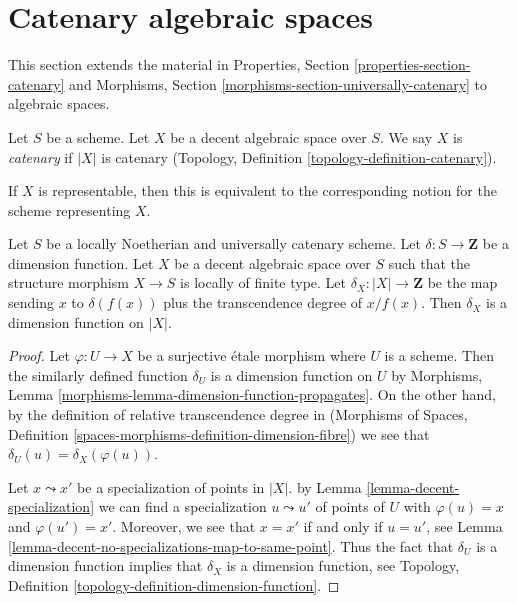 \section{Catenary algebraic spaces}
\label{section-catenary}

\noindent
This section extends the material in
Properties, Section \ref{properties-section-catenary}
and Morphisms, Section \ref{morphisms-section-universally-catenary}
to algebraic spaces.

\begin{definition}
\label{definition-catenary}
Let $S$ be a scheme. Let $X$ be a decent algebraic space over $S$.
We say $X$ is {\it catenary} if $|X|$ is catenary
(Topology, Definition \ref{topology-definition-catenary}).
\end{definition}

\noindent
If $X$ is representable, then this is equivalent to the corresponding notion
for the scheme representing $X$.

\begin{lemma}
\label{lemma-scheme-with-dimension-function}
Let $S$ be a locally Noetherian and universally catenary scheme.
Let $\delta : S \to \mathbf{Z}$ be a dimension function.
Let $X$ be a decent algebraic space over $S$ such that
the structure morphism $X \to S$ is locally of
finite type. Let $\delta_X : |X| \to \mathbf{Z}$ be the map
sending $x$ to $\delta(f(x))$ plus the transcendence degree
of $x/f(x)$. Then $\delta_X$ is a dimension function on $|X|$.
\end{lemma}

\begin{proof}
Let $\varphi : U \to X$ be a surjective \'etale morphism where $U$ is a scheme.
Then the similarly defined function $\delta_U$ is a
dimension function on $U$ by
Morphisms, Lemma \ref{morphisms-lemma-dimension-function-propagates}.
On the other hand, by the definition of relative transcendence degree in
(Morphisms of Spaces, Definition
\ref{spaces-morphisms-definition-dimension-fibre}) we see
that $\delta_U(u) = \delta_X(\varphi(u))$.

\medskip\noindent
Let $x \leadsto x'$ be a specialization of points in $|X|$.
by Lemma \ref{lemma-decent-specialization} we can find
a specialization $u \leadsto u'$ of points of $U$ with
$\varphi(u) = x$ and $\varphi(u') = x'$. Moreover, we see
that $x = x'$ if and only if $u = u'$, see
Lemma \ref{lemma-decent-no-specializations-map-to-same-point}.
Thus the fact that $\delta_U$ is a dimension function implies that
$\delta_X$ is a dimension function, see
Topology, Definition \ref{topology-definition-dimension-function}.
\end{proof}

